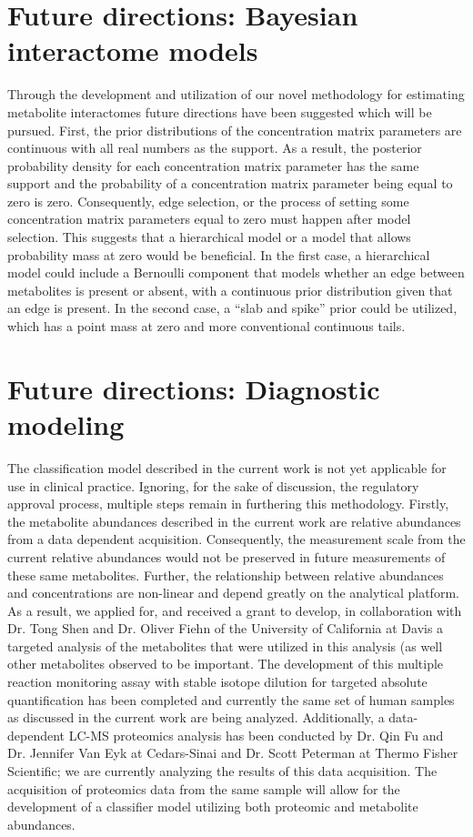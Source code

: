\begin{DoubleSpace*}
\section{Future directions: Bayesian interactome models}
Through the development and utilization of our novel methodology for estimating metabolite interactomes future directions have been suggested which will be pursued. First, the prior distributions of the concentration matrix parameters are continuous with all real numbers as the support. As a result, the posterior probability density for each concentration matrix parameter has the same support and the probability of a concentration matrix parameter being equal to zero is zero. Consequently, edge selection, or the process of setting some concentration matrix parameters equal to zero must happen after model selection. This suggests that a hierarchical model or a model that allows probability mass at zero would be beneficial. In the first case, a hierarchical model could include a Bernoulli component that models whether an edge between metabolites is present or absent, with a continuous prior distribution given that an edge is present. In the second case, a ``slab and spike'' prior could be utilized, which has a point mass at zero and more conventional continuous tails.

\section{Future directions: Diagnostic modeling}
The classification model described in the current work is not yet applicable for use in clinical practice. Ignoring, for the sake of discussion, the regulatory approval process, multiple steps remain in furthering this methodology. Firstly, the metabolite abundances described in the current work are relative abundances from a data dependent acquisition. Consequently, the measurement scale from the current relative abundances would not be preserved in future measurements of these same metabolites. Further, the relationship between relative abundances and concentrations are non-linear and depend greatly on the analytical platform. As a result, we applied for, and received a grant to develop, in collaboration with Dr. Tong Shen and Dr. Oliver Fiehn of the University of California at Davis a targeted analysis of the metabolites that were utilized in this analysis (as well other metabolites observed to be important. The development of this multiple reaction monitoring assay with stable isotope dilution for targeted absolute quantification has been completed and currently the same set of human samples as discussed in the current work are being analyzed. Additionally, a data-dependent LC-MS proteomics analysis has been conducted by Dr. Qin Fu and Dr. Jennifer Van Eyk at Cedars-Sinai and Dr. Scott Peterman at Thermo Fisher Scientific; we are currently analyzing the results of this data acquisition.  The acquisition of proteomics data from the same sample will allow for the development of a classifier model utilizing both proteomic and metabolite abundances. 


\end{DoubleSpace*}
